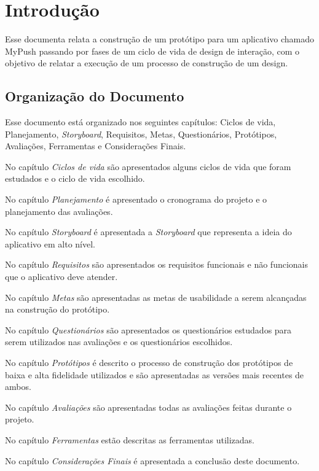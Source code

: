 \chapter{Introdução}

Esse documenta relata a construção de um protótipo para um aplicativo chamado MyPush passando por fases de um ciclo de vida
de design de interação, com o objetivo de relatar a execução de um processo de construção de um design.

\section{Organização do Documento}

Esse documento está organizado nos seguintes capítulos: Ciclos de vida, Planejamento, \textit{Storyboard}, Requisitos,
Metas, Questionários, Protótipos, Avaliações, Ferramentas e Considerações Finais.

No capítulo \textit{Ciclos de vida} são apresentados alguns ciclos de vida que foram estudados e o ciclo de vida escolhido.

No capítulo \textit{Planejamento} é apresentado o cronograma do projeto e o planejamento das avaliações.

No capítulo \textit{Storyboard} é apresentada a \textit{Storyboard} que representa a ideia do aplicativo em alto nível.

No capítulo \textit{Requisitos} são apresentados os requisitos funcionais e não funcionais que o aplicativo deve atender.

No capítulo \textit{Metas} são apresentadas as metas de usabilidade a serem alcançadas na construção do protótipo.

No capítulo \textit{Questionários} são apresentados os questionários estudados para serem utilizados nas avaliações e os questionários
escolhidos.

No capítulo \textit{Protótipos} é descrito o processo de construção dos protótipos de baixa e alta fidelidade utilizados e são apresentadas
as versões mais recentes de ambos.

No capítulo \textit{Avaliações} são apresentadas todas as avaliações feitas durante o projeto.

No capítulo \textit{Ferramentas} estão descritas as ferramentas utilizadas.

No capítulo \textit{Considerações Finais} é apresentada a conclusão deste documento.

